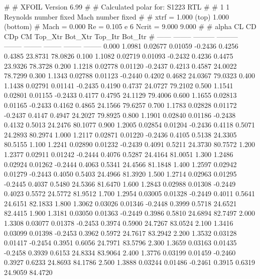#  
#       XFOIL         Version 6.99
#  
# Calculated polar for: S1223 RTL                                       
#  
# 1 1 Reynolds number fixed          Mach number fixed         
#  
# xtrf =   1.000 (top)        1.000 (bottom)  
# Mach =   0.000     Re =     0.105 e 6     Ncrit =   9.000  9.000
#  
#   alpha    CL        CD       CDp       CM     Top_Xtr  Bot_Xtr  Top_Itr  Bot_Itr
#  ------ -------- --------- --------- -------- -------- -------- -------- --------
   0.000   1.0981   0.02677   0.01059  -0.2436   0.4256   0.4385  23.8731  78.0826
   0.100   1.1082   0.02719   0.01093  -0.2432   0.4236   0.4475  23.9326  78.3728
   0.200   1.1218   0.02778   0.01120  -0.2437   0.4213   0.4587  24.0022  78.7299
   0.300   1.1343   0.02788   0.01123  -0.2440   0.4202   0.4682  24.0367  79.0323
   0.400   1.1438   0.02791   0.01141  -0.2435   0.4190   0.4737  24.0727  79.2102
   0.500   1.1541   0.02801   0.01155  -0.2433   0.4177   0.4795  24.1129  79.4006
   0.600   1.1655   0.02813   0.01165  -0.2433   0.4162   0.4865  24.1566  79.6257
   0.700   1.1783   0.02828   0.01172  -0.2437   0.4147   0.4947  24.2027  79.8925
   0.800   1.1901   0.02840   0.01186  -0.2438   0.4132   0.5013  24.2476  80.1077
   0.900   1.2005   0.02854   0.01204  -0.2436   0.4118   0.5071  24.2893  80.2974
   1.000   1.2117   0.02871   0.01220  -0.2436   0.4105   0.5138  24.3305  80.5155
   1.100   1.2241   0.02890   0.01232  -0.2439   0.4091   0.5211  24.3730  80.7572
   1.200   1.2377   0.02911   0.01242  -0.2444   0.4076   0.5287  24.4164  81.0051
   1.300   1.2486   0.02924   0.01262  -0.2444   0.4063   0.5341  24.4566  81.1848
   1.400   1.2597   0.02942   0.01279  -0.2443   0.4050   0.5403  24.4966  81.3920
   1.500   1.2714   0.02963   0.01295  -0.2445   0.4037   0.5480  24.5366  81.6470
   1.600   1.2843   0.02988   0.01308  -0.2449   0.4023   0.5572  24.5772  81.9512
   1.700   1.2954   0.03005   0.01328  -0.2449   0.4011   0.5641  24.6151  82.1833
   1.800   1.3062   0.03026   0.01346  -0.2448   0.3999   0.5718  24.6521  82.4415
   1.900   1.3181   0.03050   0.01363  -0.2449   0.3986   0.5810  24.6894  82.7497
   2.000   1.3308   0.03077   0.01378  -0.2453   0.3974   0.5900  24.7267  83.0524
   2.100   1.3416   0.03099   0.01398  -0.2453   0.3962   0.5972  24.7617  83.2942
   2.200   1.3532   0.03128   0.01417  -0.2454   0.3951   0.6056  24.7971  83.5796
   2.300   1.3659   0.03163   0.01435  -0.2458   0.3939   0.6153  24.8334  83.9064
   2.400   1.3776   0.03199   0.01459  -0.2460   0.3927   0.6233  24.8693  84.1786
   2.500   1.3888   0.03244   0.01486  -0.2461   0.3915   0.6319  24.9059  84.4720
